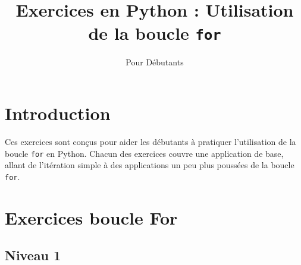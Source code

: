 \documentclass{article}
\title{Exercices en Python : Utilisation de la boucle \texttt{for}}
\author{Pour Débutants}
\date{}
\begin{document}
\maketitle

\section*{Introduction}

Ces exercices sont conçus pour aider les débutants à pratiquer l'utilisation de la boucle \texttt{for} en Python. Chacun des exercices couvre une application de base, allant de l'itération simple à des applications un peu plus poussées de la boucle \texttt{for}.

\section*{Exercices boucle For}
\subsection{Niveau 1}
\end{document}
